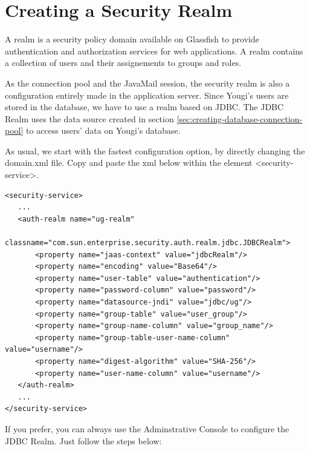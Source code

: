 \documentclass[envcountsame,envcountchap]{svmono}
\begin{document}
\section{Creating a Security Realm}

A realm is a security policy domain available on Glassfish to provide authentication and authorization services for web applications. A realm contains a collection of users and their assignements to groups and roles.

As the connection pool and the JavaMail session, the security realm is also a configuration entirely made in the application server. Since Yougi's users are stored in the database, we have to use a realm based on JDBC. The JDBC Realm uses the data source created in section \ref{sec:creating-database-connection-pool} to access users' data on Yougi's database.

As usual, we start with the fastest configuration option, by directly changing the domain.xml file. Copy and paste the xml below within the element \textless security-service\textgreater .

\begin{verbatim}
<security-service>
   ...
   <auth-realm name="ug-realm"
       classname="com.sun.enterprise.security.auth.realm.jdbc.JDBCRealm">
       <property name="jaas-context" value="jdbcRealm"/>
       <property name="encoding" value="Base64"/>
       <property name="user-table" value="authentication"/>          
       <property name="password-column" value="password"/>
       <property name="datasource-jndi" value="jdbc/ug"/>
       <property name="group-table" value="user_group"/>
       <property name="group-name-column" value="group_name"/>
       <property name="group-table-user-name-column" value="username"/>
       <property name="digest-algorithm" value="SHA-256"/>
       <property name="user-name-column" value="username"/>
   </auth-realm>
   ...
</security-service>
\end{verbatim}

If you prefer, you can always use the Adminstrative Console to configure the JDBC Realm. Just follow the steps below:
\end{document}
